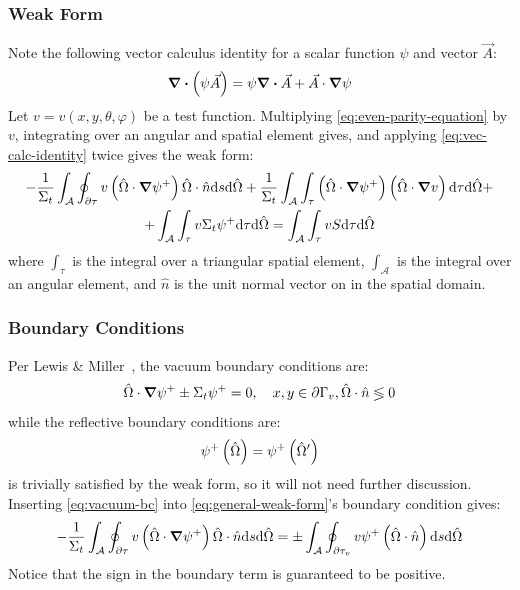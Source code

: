 \begin{frame}
  \frametitle{Weak Form}
  Note the following vector calculus identity for a scalar function $\psi$ and vector $\vec{A}$:
  \begin{equation}
    \label{eq:vec-calc-identity}
    \div \left(\psi\vec{A}\right)=\psi\div\vec{A}+\vec{A}\cdot\grad\psi
  \end{equation}
  Let $v=v(x,y,\theta,\varphi)$ be a test function.
  Multiplying \cref{eq:even-parity-equation} by $v$, integrating over an angular and spatial element gives, and applying \cref{eq:vec-calc-identity} twice gives the weak form:
  \begin{multline}\label{eq:general-weak-form}
    -\frac{1}{\Sigma_t}\int_{\mathcal{A}}\oint_{\partial \tau}v\left(\hat{\Omega}\cdot\grad{\psi^+}\right)\hat{\Omega}\cdot\hat{n}\dd s\dd\hat{\Omega}+\frac{1}{\Sigma_t}\int_{\mathcal{A}}\int_{\tau}\left(\hat{\Omega}\cdot\grad{\psi^+}\right)\left(\hat{\Omega}\cdot\grad{v}\right)\dd \tau \dd \hat{\Omega}+\\+
    \int_{\mathcal{A}}\int_{\tau} v\Sigma_t \psi^+\dd \tau \dd \hat{\Omega}=\int_{\mathcal{A}}\int_{\tau} vS\dd \tau \dd \hat{\Omega}
  \end{multline}
  where $\int_\tau$ is the integral over a triangular spatial element, $\int_\mathcal{A}$ is the integral over an angular element, and $\hat{n}$ is the unit normal vector on in the spatial domain.
\end{frame}

\begin{frame}
  \frametitle{Boundary Conditions}
  Per Lewis \& Miller~\cite{lewisComputationalMethodsNeutron1993}, the vacuum boundary conditions are:
  \begin{equation}\label{eq:vacuum-bc}
    \hat{\Omega}\cdot\grad{\psi^+}\pm\Sigma_t\psi^+=0,\quad x,y\in \partial\Gamma_v,\hat{\Omega}\cdot\hat{n}\lessgtr 0
  \end{equation}
  while the reflective boundary conditions are:
  \begin{equation}\label{eq:reflect-bc}
    \psi^+\left(\hat{\Omega}\right)=\psi^+\left(\hat{\Omega} '\right)
  \end{equation}
   is trivially satisfied by the weak form, so it will not need further discussion.
  Inserting \cref{eq:vacuum-bc} into \cref{eq:general-weak-form}'s boundary condition gives:
  \begin{equation}
    -\frac{1}{\Sigma_t}\int_{\mathcal{A}}\oint_{\partial \tau}v\left(\hat{\Omega}\cdot\grad{\psi^+}\right)\hat{\Omega}\cdot\hat{n}\dd s\dd\hat{\Omega}=\pm \int_\mathcal{A}\oint_{\partial\tau_v}v\psi^+\left(\hat{\Omega}\cdot\hat{n}\right)\dd s\dd \hat{\Omega}
  \end{equation}
  Notice that the sign in the boundary term is guaranteed to be positive.

\end{frame}

